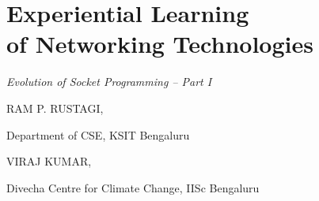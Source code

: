 \chapter{Experiential Learning\\ of Networking Technologies}
\vskip -15pt

\centerline{{\LARGE\sl Evolution of Socket Programming – Part I}}

\vskip 0.8cm

\begin{center}
{\large\uppercase{Ram P. Rustagi}}, 

\vskip -6pt

Department of CSE, KSIT Bengaluru 


\bigskip
{\large\uppercase{Viraj Kumar,}} 

\vskip -6pt

Divecha Centre for Climate Change, IISc Bengaluru

\end{center}

\vskip 2.3cm



\vfill
\newpage

